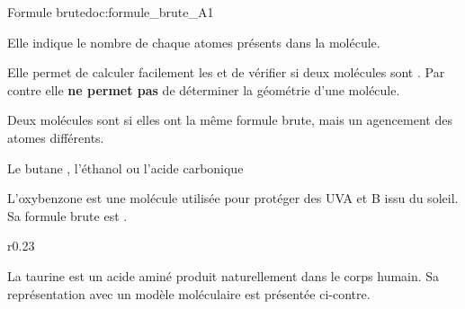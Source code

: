 %



\vspace*{-12pt}

\vspace*{-8pt}
\begin{doc}{Formule brute}{doc:formule_brute_A1}
  \begin{encart}
    Elle indique le nombre de chaque atomes présents dans la molécule.
  \end{encart}
  Elle permet de calculer facilement les  et de vérifier si deux molécules sont .
  Par contre elle \textbf{ne permet pas} de déterminer la géométrie d'une molécule.

  \begin{encart}
    Deux molécules sont  si elles ont la même formule brute, mais un agencement des atomes différents.
  \end{encart}

  \exemple Le butane , l'éthanol  ou l'acide carbonique 
\end{doc}

L'oxybenzone est une molécule utilisée pour protéger des UVA et B issu du soleil.
Sa formule brute est .



\begin{wrapfigure}[2]{r}{0.23\linewidth}
  \vspace*{-28pt}
\end{wrapfigure}

La taurine est un acide aminé produit naturellement dans le corps humain.
Sa représentation avec un modèle moléculaire est présentée ci-contre.



